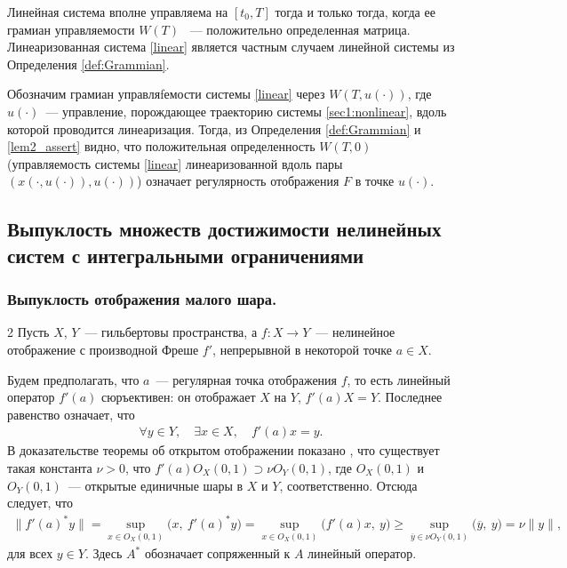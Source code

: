 \documentclass[../main.tex]{subfiles}
\begin{document}
	 Линейная система вполне управляема на  $ [t_0, T] $ тогда и только тогда, когда ее грамиан управляемости $W(T)$ ~--- положительно определенная матрица. Линеаризованная система \eqref{linear} является частным случаем линейной системы из Определения \ref{def:Grammian}. 
	
	 Обозначим грамиан управляfемости системы \eqref{linear} через $W(T,u(\cdot))$, где $u(\cdot)$~--- управление, порождающее траекторию системы \eqref{sec1:nonlinear}, вдоль которой проводится линеаризация. Тогда, из Определения \ref{def:Grammian} и \eqref{lem2_assert} видно, что положительная определенность $W(T,0)$ (управляемость системы \eqref{linear} линеаризованной вдоль пары $\left( x(\cdot,u(\cdot)),u(\cdot)\right)   $) означает регулярность отображения $F$ в точке $u(\cdot) $. 
	
	\subsection{Выпуклость множеств достижимости нелинейных систем с интегральными ограничениями}
	\subsubsection{Выпуклость отображения малого шара.}
	2
	Пусть $X$, $Y$~--- гильбертовы пространства, а $f: X \rightarrow Y$~--- нелинейное отображение с производной Фреше $f'$, непрерывной в некоторой точке $a \in X$.
	
	Будем предполагать, что $a$~--- регулярная точка отображения $f$, то есть линейный оператор $f'(a)$ сюръективен: он отображает $X$ на $Y$, $ f'(a) X = Y $.  Последнее равенство означает, что 
	\begin{gather}\label{regularity_cond}
		\forall y \in Y, \quad \exists x \in X, \quad f'(a) x = y.
	\end{gather}
	В доказательстве теоремы об открытом отображении показано \cite[Теорема 2.11, Теорема 4.13]{Rudin}, что существует такая константа $\nu > 0$, что $f'(a) O_X(0, 1) \supset \nu O_Y(0, 1)$, где $ O_X(0, 1)$ и  $O_Y(0, 1)$~--- открытые единичные шары в $X$ и $Y$, соответственно. Отсюда следует, что
	\begin{gather}\label{LyusternikConditionProof}
		\| f'(a)^* y \| = \sup\limits_{x \in O_X(0, 1)} \big(x,\  f'(a)^* y\big) =  \sup\limits_{x \in O_X(0, 1)} \big(f'(a) x,\  y\big) \geqslant  \sup\limits_{\overline{y} \in \nu O_Y(0, 1)} \big(\overline{y},\  y\big) = \nu \|y\|,
	\end{gather}
	для всех $y \in Y$. Здесь $A^*$ обозначает сопряженный к $A$ линейный оператор.
	
\end{document}
